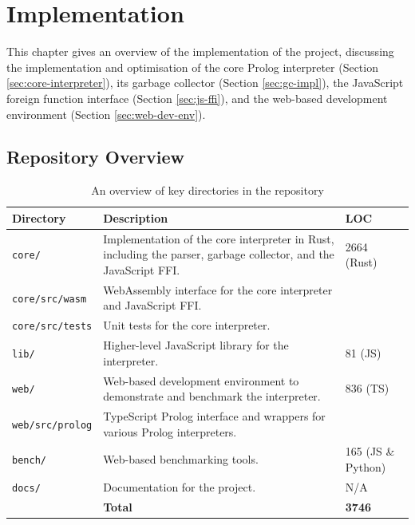 
\chapter{Implementation}

This chapter gives an overview of the implementation of the project, discussing the implementation and optimisation of the core Prolog interpreter (Section \ref{sec:core-interpreter}), its garbage collector (Section \ref{sec:gc-impl}), the JavaScript foreign function interface (Section \ref{sec:js-ffi}), and the web-based development environment (Section \ref{sec:web-dev-env}).

\section{Repository Overview}

\begin{table}[H]
\centering
\begin{tabular}{lp{9cm}l}
\hline
\textbf{Directory} & \textbf{Description} & \textbf{LOC} \\
\hline
\texttt{core/} & Implementation of the core interpreter in Rust, including the parser, garbage collector, and the JavaScript FFI. & 2664 (Rust) \\
\texttt{core/src/wasm} & WebAssembly interface for the core interpreter and JavaScript FFI. & \\
\texttt{core/src/tests} & Unit tests for the core interpreter. & \\
\texttt{lib/} & Higher-level JavaScript library for the interpreter. & 81 (JS) \\
\texttt{web/} & Web-based development environment to demonstrate and benchmark the interpreter. & 836 (TS) \\
\texttt{web/src/prolog} & TypeScript Prolog interface and wrappers for various Prolog interpreters. & \\
\texttt{bench/} & Web-based benchmarking tools. & 165 (JS \& Python) \\
\texttt{docs/} & Documentation for the project. & N/A \\
\hline
& \hfill \textbf{Total} & \textbf{3746} \\
\hline
\end{tabular}
\caption{An overview of key directories in the repository}
\label{tab:repository-overview}
\end{table}

